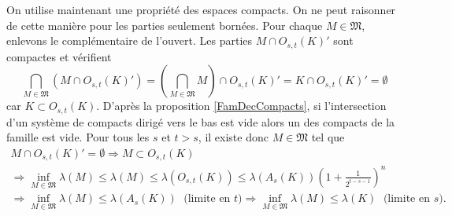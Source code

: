\begin{demo}
On utilise maintenant une propriété des espaces compacts. On ne peut raisonner de cette manière pour les parties seulement bornées.\newline
Pour chaque $M\in \mathfrak{M}$, enlevons le complémentaire de l'ouvert. Les parties $M \cap O_{s,t}(K)'$ sont compactes et vérifient
\begin{displaymath}
 \bigcap_{M \in \mathfrak{M}} \left(M \cap O_{s,t}(K)'\right)
 = \left(\bigcap_{M \in \mathfrak{M}} M\right) \cap O_{s,t}(K)'
 = K \cap O_{s,t}(K)'
 = \emptyset
\end{displaymath}
car $K \subset O_{s,t}(K)$.\newline
D'après la proposition \ref{FamDecCompacts}, si l'intersection d'un système de compacts dirigé vers le bas est vide alors un des compacts de la famille est vide.\newline
Pour tous les $s$ et $t>s$, il existe donc $M \in \mathfrak{M}$ tel que
\begin{multline*}
 M \cap O_{s,t}(K)'=\emptyset
 \Rightarrow M \subset O_{s,t}(K) \\
  \Rightarrow
  \inf_{M \in \mathfrak{M}}\lambda(M) \leq \lambda(M) \leq  \lambda(O_{s,t}(K)) \leq \lambda(A_s(K)) \left( 1 + \frac{1}{2^{t-s-1}}\right)^n \\
  \Rightarrow
  \inf_{M \in \mathfrak{M}}\lambda(M) \leq \lambda(A_s(K)) \; \text{ (limite en $t$)}
  \Rightarrow
  \inf_{M \in \mathfrak{M}}\lambda(M) \leq \lambda(K) \; \text{ (limite en $s$)}.
\end{multline*}
\end{demo}


